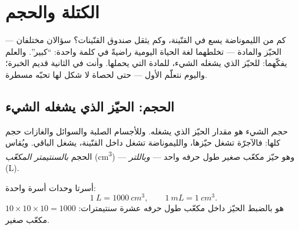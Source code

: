 \chapter{الكتلة والحجم}\label{ch:g6:mass-and-volume}

كم من الليموناضة يسع في القنّينة، وكم يثقل صندوق القنّينات؟
سؤالان مختلفان --- الحيّز والمادة --- تخلطهما لغة الحياة اليومية
راضيةً في كلمة واحدة: ``كبير''. والعلم يفكّهما:  للحيّز
الذي يشغله الشيء،  للمادة التي يحملها. وأنت في 
الثانية قديم الخبرة؛ واليوم نتعلّم  الأول --- حتى لحصاة لا
شكل لها تحبّه مسطرة.

\section{الحجم: الحيّز الذي يشغله الشيء}

\begin{definition}[الحجم]\label{def:g6:mass-and-volume:volume}
\emph{حجم} الشيء هو مقدار الحيّز الذي يشغله. وللأجسام
الصلبة والسوائل والغازات حجم كلها: فالآجرّة تشغل حيّزها،
والليموناضة تشغل داخل القنّينة،  يشغل الباقي. ويُقاس
الحجم \emph{بالسنتيمتر
المكعّب} (\unit{cm^3}) --- وهو حيّز مكعّب
صغير طول حرفه  واحد --- \emph{وباللتر}
(\unit{L}).
\end{definition}

\begin{proposition}\label{prop:g6:mass-and-volume:litre}
أسرتا وحدات  أسرة واحدة:
\[
\qty{1}{L} = \qty{1000}{cm^3},
\qquad
\qty{1}{mL} = \qty{1}{cm^3}.
\]
 هو بالضبط الحيّز داخل مكعّب طول حرفه عشرة سنتيمترات:
$10 \times 10 \times 10 = 1000$ مكعّب صغير.
\end{proposition}

